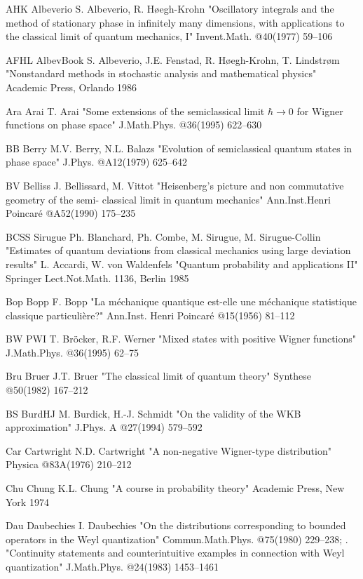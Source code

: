 \REF AHK Albeverio \Jref
    S. Albeverio, R. H\o egh-Krohn
    "Oscillatory integrals and the method of stationary phase in
    infinitely many dimensions, with applications to the classical
    limit of quantum mechanics, I"
    Invent.Math. @40(1977) 59--106

\REF AFHL AlbevBook \Bref
    S. Albeverio, J.E. Fenstad, R. H\o egh-Krohn, T. Lindstr{\o}m
    "Nonstandard methods in stochastic analysis and mathematical
    physics"
    Academic Press, Orlando 1986

\REF Ara Arai \Jref
    T. Arai
    "Some extensions of the semiclassical limit $\hbar\to0$ for
    Wigner functions on phase space"
    J.Math.Phys. @36(1995) 622--630

\REF  BB  Berry \Jref
    M.V. Berry, N.L. Balazs
    "Evolution of semiclassical quantum states in phase space"
    J.Phys. @A12(1979) 625--642

\REF BV Belliss \Jref
     J. Bellissard, M. Vittot
     "Heisenberg's picture and non commutative geometry of the semi-
     classical limit in quantum mechanics"
    Ann.Inst.Henri Poincar\'e @A52(1990) 175--235

\REF BCSS Sirugue \Gref
    Ph. Blanchard, Ph. Combe, M. Sirugue, M. Sirugue-Collin
    "Estimates of quantum deviations from classical mechanics using
    large deviation results"
    \inPr L. Accardi, W. von Waldenfels
    "Quantum probability and applications II"
    Springer Lect.Not.Math. 1136, Berlin 1985

\REF Bop Bopp \Jref
    F. Bopp
    "La m\'echanique quantique est-elle une m\'echanique statistique
    classique particuli\`ere?"
    Ann.Inst. Henri Poincar\'e @15(1956) 81--112

\REF BW PWI \Jref
    T. Br\"ocker, R.F. Werner
    "Mixed states with positive Wigner functions"
    J.Math.Phys. @36(1995) 62--75

\REF Bru Bruer \Jref
    J.T. Bruer
    "The classical limit of quantum theory"
    Synthese @50(1982) 167--212

\REF BS BurdHJ \Jref
    M. Burdick, H.-J. Schmidt
    "On the validity of the WKB approximation"
    J.Phys. A @27(1994) 579--592

\REF Car Cartwright \Jref
    N.D. Cartwright
    "A non-negative Wigner-type distribution"
    Physica @83A(1976) 210--212

\REF Chu Chung \Bref
    K.L. Chung
    "A course in probability theory"
    Academic Press, New York 1974

\REF Dau Daubechies \Jref
    I. Daubechies
    "On the distributions corresponding to bounded
     operators in the Weyl quantization"
    Commun.Math.Phys. @75(1980) 229--238\more; \hfill\break
    \Jref      \sameauthor. {}
    "Continuity statements and counterintuitive examples
     in connection with Weyl quantization"
    J.Math.Phys. @24(1983) 1453--1461


